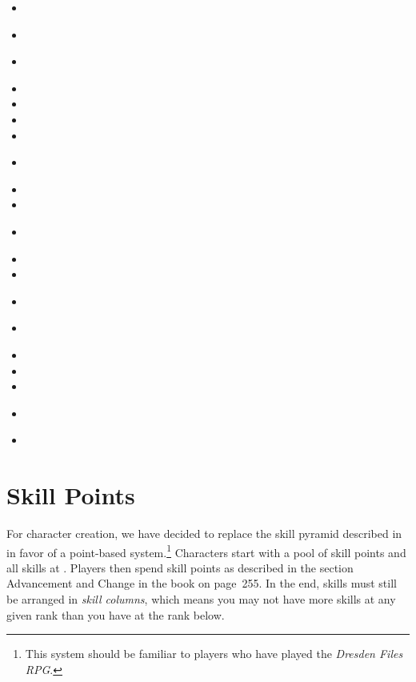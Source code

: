 \documentclass[12pt,titlepage,openany]{book}
\begin{document}
\begin{multicols}{3}
    \raggedcolumns
    \begin{itemize}
        \item \textbf{}
        \item {}
        \item \textbf{}
        \item {}
        \item {}
        \item {}
        \item {}
        \item \textbf{}
        \item {}
        \item {}
        \item \textbf{}
        \item {}
        \item {}
        \item \textbf{}
        \item \textbf{}
        \item {}
        \item {}
        \item {}
        \item \textbf{}
        \item {}
    \end{itemize}
\end{multicols}

\section{Skill Points}\label{sec:skill-points}
For character creation, we have decided to replace the skill pyramid described
in \FateCore{} in favor of a point-based system.\footnote{This system should be
familiar to players who have played the \textit{Dresden Files RPG}.} Characters
start with a pool of skill points and all skills at . Players then
spend skill points as described in the section Advancement and Change in the
\FateCore{} book on page~255. In the end, skills must still be arranged in
\emph{skill columns}, which means you may not have more skills at any given
rank than you have at the rank below.
\end{document}
